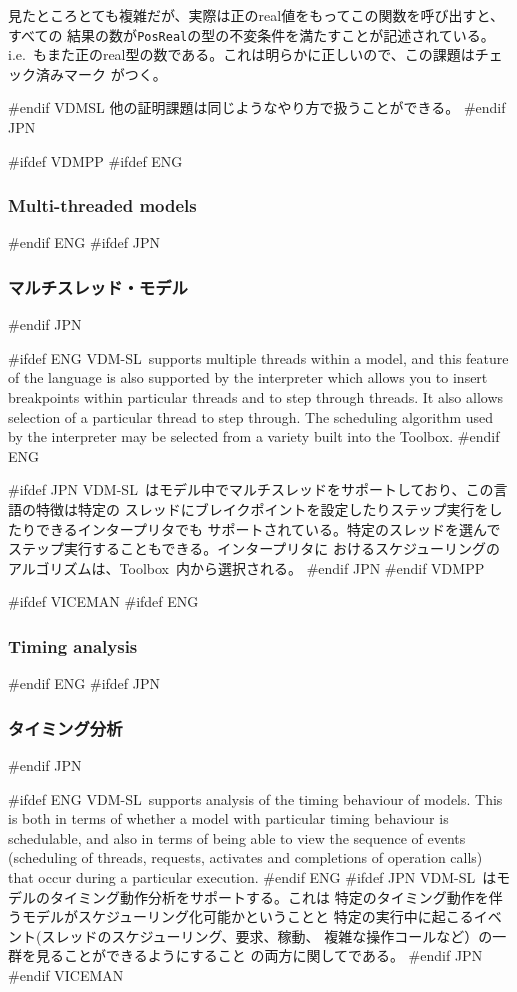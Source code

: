 \documentclass[\pformat,12pt]{article}
\newcommand{\vdmslpp}{VDM-SL}
\newcommand{\Toolbox}{Toolbox}
\newcommand{\vdmslpp}{VDM++}
\newcommand{\Toolbox}{Toolbox}
\newcommand{\aaa}{\tt }
\begin{document}
見たところとても複雑だが、実際は正のreal値をもってこの関数を呼び出すと、すべての
結果の数が{\aaa PosReal}の型の不変条件を満たすことが記述されている。i.e.\ 
もまた正のreal型の数である。これは明らかに正しいので、この課題はチェック済みマーク
がつく。

#endif VDMSL
他の証明課題は同じようなやり方で扱うことができる。
#endif JPN

#ifdef VDMPP
#ifdef ENG
\subsubsection{Multi-threaded models}
#endif ENG
#ifdef JPN
\subsubsection{マルチスレッド・モデル}
#endif JPN

#ifdef ENG
\vdmslpp\ supports multiple threads within a model, and this feature of the
language is also supported by the interpreter which allows you to
insert breakpoints within particular threads and to step
through threads. It also allows selection of a particular thread to
step through. The scheduling algorithm used by the interpreter may be
selected from a variety built into the \Toolbox.
#endif ENG

#ifdef JPN
\vdmslpp\ はモデル中でマルチスレッドをサポートしており、この言語の特徴は特定の
スレッドにブレイクポイントを設定したりステップ実行をしたりできるインタープリタでも
サポートされている。特定のスレッドを選んでステップ実行することもできる。インタープリタに
おけるスケジューリングのアルゴリズムは、\Toolbox\ 内から選択される。
#endif JPN
#endif VDMPP

#ifdef VICEMAN
#ifdef ENG
\subsubsection{Timing analysis}
#endif ENG
#ifdef JPN
\subsubsection{タイミング分析}
#endif JPN

#ifdef ENG
\vdmslpp\ supports analysis of the timing behaviour of models. This is
both in terms of whether a model with particular timing behaviour is
schedulable, and also in terms of being able to view the sequence of
events (scheduling of threads, requests, activates and completions of
operation calls) that occur during a particular execution.
#endif ENG
#ifdef JPN
\vdmslpp\ はモデルのタイミング動作分析をサポートする。これは
特定のタイミング動作を伴うモデルがスケジューリング化可能かということと
特定の実行中に起こるイベント(スレッドのスケジューリング、要求、稼動、
複雑な操作コールなど）の一群を見ることができるようにすること
の両方に関してである。
#endif JPN
#endif VICEMAN
\end{document}
